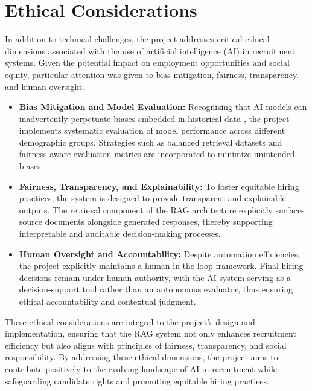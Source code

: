 \documentclass[12pt]{report}
\begin{document}
\section{Ethical Considerations}

In addition to technical challenges, the project addresses critical ethical dimensions associated with the use of artificial intelligence (AI) in recruitment systems. Given the potential impact on employment opportunities and social equity, particular attention was given to bias mitigation, fairness, transparency, and human oversight.

\setlength{\itemsep}{1pt}
\setlength{\parskip}{0pt}

\begin{itemize}
    \item \textbf{Bias Mitigation and Model Evaluation:} Recognizing that AI models can inadvertently perpetuate biases embedded in historical data \cite{tilmes-2022}, the project implements systematic evaluation of model performance across different demographic groups. Strategies such as balanced retrieval datasets and fairness-aware evaluation metrics are incorporated to minimize unintended biases.
    
    \item \textbf{Fairness, Transparency, and Explainability:} To foster equitable hiring practices, the system is designed to provide transparent and explainable outputs. The retrieval component of the RAG architecture explicitly surfaces source documents alongside generated responses, thereby supporting interpretable and auditable decision-making processes.
    
    \item \textbf{Human Oversight and Accountability:} Despite automation efficiencies, the project explicitly maintains a human-in-the-loop framework. Final hiring decisions remain under human authority, with the AI system serving as a decision-support tool rather than an autonomous evaluator, thus ensuring ethical accountability and contextual judgment.
\end{itemize}
These ethical considerations are integral to the project's design and implementation, ensuring that the RAG system not only enhances recruitment efficiency but also aligns with principles of fairness, transparency, and social responsibility. By addressing these ethical dimensions, the project aims to contribute positively to the evolving landscape of AI in recruitment while safeguarding candidate rights and promoting equitable hiring practices.
\end{document}
